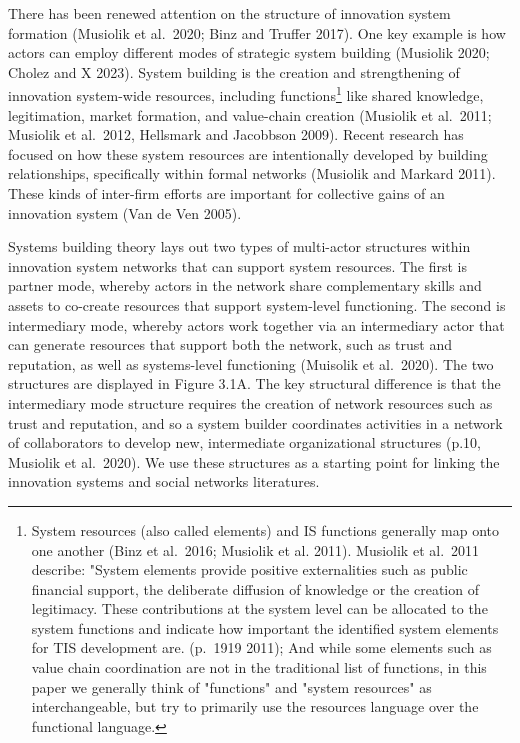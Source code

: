 \documentclass[twoside,12pt,final]{ucthesis-CA2012}
\begin{document}
\begin{ucmainmatter}
There has been renewed attention on the structure of innovation system
formation (Musiolik et al.~2020; Binz and Truffer 2017). One key example
is how actors can employ different modes of \textquotesingle strategic system
building\textquotesingle{} (Musiolik 2020; Cholez and X 2023). System building is the
creation and strengthening of innovation system-wide resources,
including functions\footnote{System resources (also called \textquotesingle elements\textquotesingle) and IS functions
  generally map onto one another (Binz et al.~2016; Musiolik et al.
  2011). Musiolik et al.~2011 describe: "System elements provide
  positive externalities such as public financial support, the
  deliberate diffusion of knowledge or the creation of legitimacy.
  These contributions at the system level can be allocated to the
  system functions and indicate how important the identified system
  elements for TIS development are.\textquotesingle{} (p.~1919 2011); And while some
  elements such as \textquotesingle value chain coordination\textquotesingle{} are not in the
  traditional list of functions, in this paper we generally think of
  "functions" and "system resources" as interchangeable, but try
  to primarily use the \textquotesingle resources\textquotesingle{} language over the \textquotesingle functional\textquotesingle{}
  language.} like shared knowledge, legitimation, market
formation, and value-chain creation (Musiolik et al.~2011; Musiolik et
al.~2012, Hellsmark and Jacobbson 2009). Recent research has focused on
how these system resources are intentionally developed by building
relationships, specifically within formal networks (Musiolik and Markard
2011). These kinds of inter-firm efforts are important for collective
gains of an innovation system (Van de Ven 2005).

Systems building theory lays out two types of multi-actor structures
within innovation system networks that can support system resources. The
first is \textquotesingle partner mode,\textquotesingle{} whereby actors in the network share
complementary skills and assets to co-create resources that support
system-level functioning. The second is \textquotesingle intermediary mode\textquotesingle, whereby
actors work together via an intermediary actor that can generate
resources that support both the network, such as trust and reputation,
as well as systems-level functioning (Muisolik et al.~2020). The two
structures are displayed in Figure 3.1A. The key structural difference
is that the intermediary mode structure requires the creation of network
resources such as trust and reputation, and so \textquotesingle a system builder
coordinates activities in a network of collaborators to develop new,
intermediate organizational structures\textquotesingle{} (p.10, Musiolik et al.~2020).
We use these structures as a starting point for linking the innovation
systems and social networks literatures.


\end{ucmainmatter}
\end{document}
